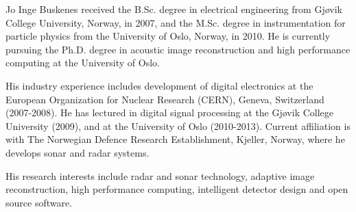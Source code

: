 
\begin{IEEEbiography}{Jo Inge Buskenes}
received the B.Sc. degree in electrical engineering from Gj\o{}vik College University, Norway, in 2007, and the M.Sc. degree in instrumentation for particle physics from the University of Oslo, Norway, in 2010. He is currently pursuing the Ph.D. degree in acoustic image reconstruction and high performance computing at the University of Oslo.

His industry experience includes development of digital electronics at the European Organization for Nuclear Research (CERN), Geneva, Switzerland (2007-2008). He has lectured in digital signal processing at the Gj\o{}vik College University (2009), and at the University of Oslo (2010-2013). Current affiliation is with The Norwegian Defence Research Establishment, Kjeller, Norway, where he develops sonar and radar systems.

His research interests include radar and sonar technology, adaptive image reconstruction, high performance computing, intelligent detector design and open source software.
\end{IEEEbiography}
